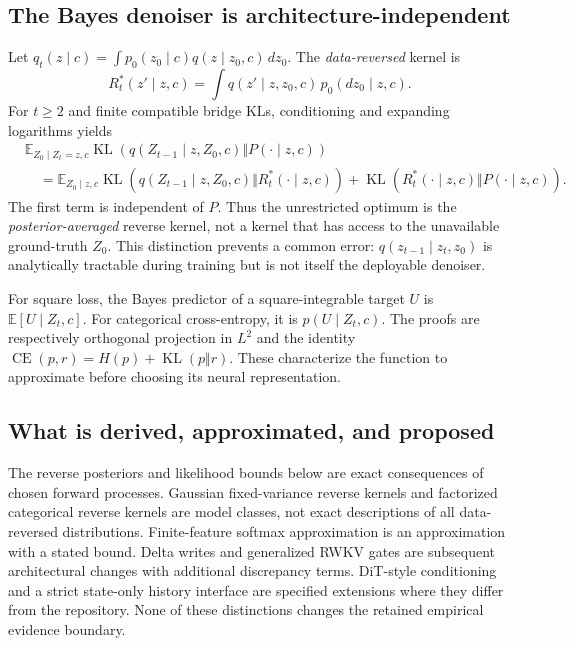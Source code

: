 \documentclass{article}
\theoremstyle{remark}\newtheorem{remark}[theorem]{Remark}
\newcommand{\E}{\mathbb E}
\newcommand{\KL}{\operatorname{KL}}
\begin{document}
\subsection{The Bayes denoiser is architecture-independent}
Let $q_t(z\mid c)=\int p_0(z_0\mid c)q(z\mid z_0,c)\,dz_0$. The \emph{data-reversed} kernel is
\begin{equation}
 R_t^*(z'\mid z,c)
 =\int q(z'\mid z,z_0,c)\,p_0(dz_0\mid z,c).
 \label{eq:oraclereverse}
\end{equation}
For $t\ge2$ and finite compatible bridge KLs, conditioning and expanding logarithms yields
\begin{align}
 &\E_{Z_0\mid Z_t=z,c}\KL(q(Z_{t-1}\mid z,Z_0,c)\Vert P(\cdot\mid z,c))\nonumber\\
 &\quad=\E_{Z_0\mid z,c}\KL(q(Z_{t-1}\mid z,Z_0,c)\Vert R_t^*(\cdot\mid z,c))
 +\KL(R_t^*(\cdot\mid z,c)\Vert P(\cdot\mid z,c)).
 \label{eq:conditionalprojection}
\end{align}
The first term is independent of $P$. Thus the unrestricted optimum is the \emph{posterior-averaged} reverse kernel, not a kernel that has access to the unavailable ground-truth $Z_0$. This distinction prevents a common error: $q(z_{t-1}\mid z_t,z_0)$ is analytically tractable during training but is not itself the deployable denoiser.

For square loss, the Bayes predictor of a square-integrable target $U$ is $\E[U\mid Z_t,c]$. For categorical cross-entropy, it is $p(U\mid Z_t,c)$. The proofs are respectively orthogonal projection in $L^2$ and the identity $\operatorname{CE}(p,r)=H(p)+\KL(p\Vert r)$. These characterize the function to approximate before choosing its neural representation.

\subsection{What is derived, approximated, and proposed}
The reverse posteriors and likelihood bounds below are exact consequences of chosen forward processes. Gaussian fixed-variance reverse kernels and factorized categorical reverse kernels are model classes, not exact descriptions of all data-reversed distributions. Finite-feature softmax approximation is an approximation with a stated bound. Delta writes and generalized RWKV gates are subsequent architectural changes with additional discrepancy terms. DiT-style conditioning and a strict state-only history interface are specified extensions where they differ from the repository. None of these distinctions changes the retained empirical evidence boundary.
\end{document}
